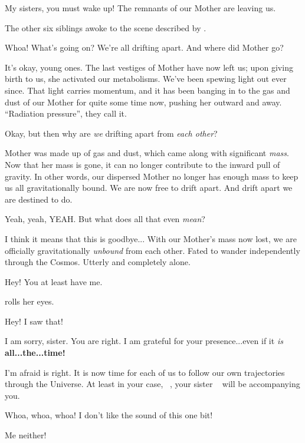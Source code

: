 \documentclass[main.tex]{subfiles}
\begin{document}
\newpara \Sterope My sisters, you must wake up!  The remnants of our Mother are leaving us.

\newpara \nar The other six siblings awoke to the scene described by \rmsterope.  

\newpara \Electra Whoa!  What's going on?  We're all drifting apart.  And where did Mother go?

\newpara \Maia It's okay, young ones.  The last vestiges of Mother have now left us; upon giving birth to us, she activated our metabolisms.  We've been spewing light out ever since.  That light carries momentum, and it has been banging in to the gas and dust of our Mother for quite some time now, pushing her outward and away.  ``Radiation pressure'', they call it.

\newpara \Electra Okay, but then why are \textit{we} drifting apart from \textit{each other}?

\newpara \Maia Mother was made up of gas and dust, which came along with significant \textit{mass}.  Now that her mass is gone, it can no longer contribute to the inward pull of gravity.  In other words, our dispersed  Mother no longer has enough mass to keep us all gravitationally bound.  We are now free to drift apart.  And drift apart we are destined to do.  

\newpara \Taygete Yeah, yeah, YEAH.  But what does all that even \textit{mean}?

\newpara \Alcyone I think it means that this is goodbye...  With our Mother's mass now lost, we are officially gravitationally \textit{unbound} from each other.  Fated to wander independently through the Cosmos.  Utterly and completely alone.

\newpara \Taygete Hey!  You at least have me.

\newpara \nar \rmalcyone rolls her eyes.

\newpara \Taygete Hey!  I saw that!

\newpara \Alcyone I am sorry, sister.  You are right.  I am grateful for your presence...even if it \textit{is} \textbf{all...the...time!}

\newpara \Maia I'm afraid \rmalcyone is right.  It is now time for each of us to follow our own trajectories through the Universe.  At least in your case, \rmtaygete~, your sister \rmalcyone~ will be accompanying you.

\newpara \Electra Whoa, whoa, whoa!  I don't like the sound of this one bit!

\newpara \Sterope Me neither!
\end{document}
